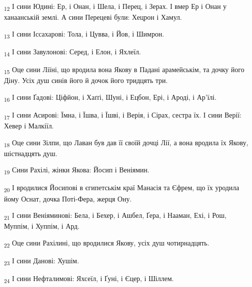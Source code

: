 \begin{tcolorbox}
\textsubscript{12} І сини Юдині: Ер, і Онан, і Шела, і Перец, і Зерах. І вмер Ер і Онан у ханаанській землі. А сини Перецеві були: Хецрон і Хамул.
\end{tcolorbox}
\begin{tcolorbox}
\textsubscript{13} І сини Іссахарові: Тола, і Цувва, і Йов, і Шимрон.
\end{tcolorbox}
\begin{tcolorbox}
\textsubscript{14} І сини Завулонові: Серед, і Елон, і Яхлеїл.
\end{tcolorbox}
\begin{tcolorbox}
\textsubscript{15} Оце сини Ліїні, що вродила вона Якову в Падані арамейськім, та дочку його Діну. Усіх душ синів його й дочок його тридцять три.
\end{tcolorbox}
\begin{tcolorbox}
\textsubscript{16} І сини Ґадові: Ціфйон, і Хаґґі, Шуні, і Ецбон, Ері, і Ароді, і Ар'їлі.
\end{tcolorbox}
\begin{tcolorbox}
\textsubscript{17} І сини Асирові: Їмна, і Їшва, і Їшві, і Верія, і Сірах, сестра їх. І сини Верії: Хевер і Малкіїл.
\end{tcolorbox}
\begin{tcolorbox}
\textsubscript{18} Оце сини Зілпи, що Лаван був дав її своїй дочці Лії, а вона вродила їх Якову, шістнадцять душ.
\end{tcolorbox}
\begin{tcolorbox}
\textsubscript{19} Сини Рахілі, жінки Якова: Йосип і Веніямин.
\end{tcolorbox}
\begin{tcolorbox}
\textsubscript{20} І вродилися Йосипові в єгипетськім краї Манасія та Єфрем, що їх уродила йому Оснат, дочка Поті-Фера, жерця Ону.
\end{tcolorbox}
\begin{tcolorbox}
\textsubscript{21} І сини Веніяминові: Бела, і Бехер, і Ашбел, Ґера, і Нааман, Ехі, і Рош, Муппім, і Хуппім, і Ард.
\end{tcolorbox}
\begin{tcolorbox}
\textsubscript{22} Оце сини Рахілині, що вродилися Якову, усіх душ чотирнадцять.
\end{tcolorbox}
\begin{tcolorbox}
\textsubscript{23} І сини Данові: Хушім.
\end{tcolorbox}
\begin{tcolorbox}
\textsubscript{24} І сини Нефталимові: Яхсеїл, і Ґуні, і Єцер, і Шіллем.
\end{tcolorbox}
